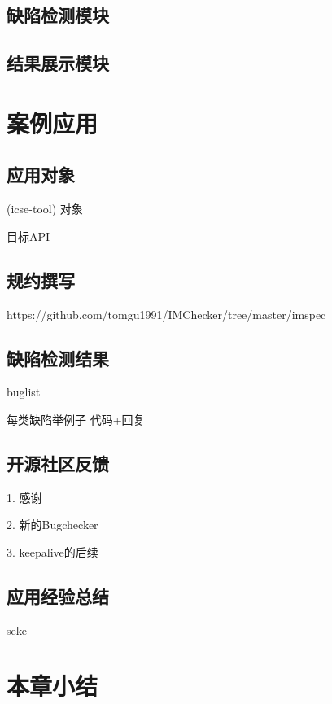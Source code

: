 \subsection{缺陷检测模块}
\subsection{结果展示模块}

\section{案例应用}
\label{sec:4.4}
\subsection{应用对象}
(icse-tool)
对象

目标API
\subsection{规约撰写}
https://github.com/tomgu1991/IMChecker/tree/master/imspec

\subsection{缺陷检测结果}

buglist

每类缺陷举例子
代码+回复


\subsection{开源社区反馈}
1. 感谢

2. 新的Bugchecker

3. keepalive的后续

\subsection{应用经验总结}

seke

\section{本章小结}
